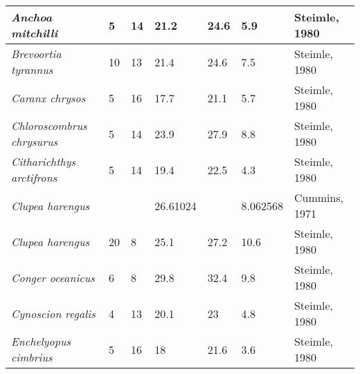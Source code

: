 \documentclass[a4paper]{article} %
\begin{document}
\begin{landscape}
\begin{longtable}[]{|l|p{1.8cm}|p{2cm}|p{2cm}|p{2.15cm}|p{1.9cm}|l|}
    \textit{Anchoa mitchilli}                & 5                            & 14                         & 21.2                          & 24.6                              & 5.9                      & Steimle, 1980                \\ \hline
    \textit{Brevoortia tyrannus}             & 10                           & 13                         & 21.4                          & 24.6                              & 7.5                      & Steimle, 1980                \\ \hline
    \textit{Caranx chrysos}                  & 5                            & 16                         & 17.7                          & 21.1                              & 5.7                      & Steimle, 1980                \\ \hline
    \textit{Chloroscombrus chrysurus}        & 5                            & 14                         & 23.9                          & 27.9                              & 8.8                      & Steimle, 1980                \\ \hline
    \textit{Citharichthys arctifrons}        & 5                            & 14                         & 19.4                          & 22.5                              & 4.3                      & Steimle, 1980                \\ \hline
    \textit{Clupea harengus}                 &                              &                            & 26.61024                      &                                   & 8.062568                 & Cummins, 1971                \\ \hline
    \textit{Clupea harengus}                 & 20                           & 8                          & 25.1                          & 27.2                              & 10.6                     & Steimle, 1980                \\ \hline
    \textit{Conger oceanicus}                & 6                            & 8                          & 29.8                          & 32.4                              & 9.8                      & Steimle, 1980                \\ \hline
    \textit{Cynoscion regalis}               & 4                            & 13                         & 20.1                          & 23                                & 4.8                      & Steimle, 1980                \\ \hline
    \textit{Enchelyopus cimbrius}            & 5                            & 16                         & 18                            & 21.6                              & 3.6                      & Steimle, 1980                \\ \hline

\end{longtable}
\end{landscape}
\end{document}
